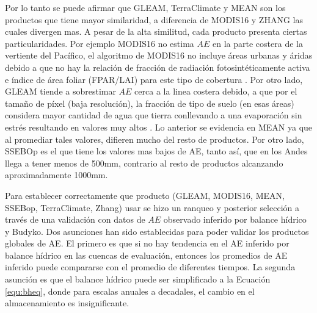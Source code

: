 \documentclass[12pt]{article}
\begin{document}
Por lo tanto se puede afirmar que GLEAM, TerraClimate y MEAN son los productos que tiene mayor similaridad, a diferencia de MODIS16 y ZHANG las cuales divergen mas. A pesar de la alta similitud, cada producto presenta ciertas particularidades. Por ejemplo MODIS16 no estima $AE$ en la parte costera de la vertiente del Pacífico, el algoritmo de MODIS16 no incluye áreas urbanas y áridas debido a que no hay la relación de fracción de radiación fotosintéticamente activa e índice de área foliar (FPAR/LAI) para este tipo de cobertura \citep{mu2013modis}. Por otro lado, GLEAM tiende a sobrestimar $AE$ cerca a la linea costera debido, a que por el tamaño de píxel (baja resolución), la fracción de tipo de suelo (en esas áreas) considera mayor cantidad de agua que tierra conllevando a una evaporación sin estrés resultando en valores muy altos \citep{Martens2017}. Lo anterior se evidencia en MEAN ya que al promediar tales valores, difieren mucho del resto de productos. Por otro lado, SSEBOp es el que tiene los valores mas bajos de AE, tanto así, que en los Andes llega a tener menos de 500mm, contrario al resto de productos alcanzando aproximadamente 1000mm.



Para establecer correctamente que producto (GLEAM, MODIS16, MEAN, SSEBop, TerraClimate, Zhang) usar se hizo un ranqueo y posterior selección a través de una validación con datos de $AE$ observado inferido por balance hídrico y Budyko. Dos asunciones han sido establecidas para poder validar los productos globales de AE. El primero es que si no hay tendencia en el AE inferido por balance hídrico en las cuencas de evaluación, entonces los promedios de AE inferido puede compararse con el promedio de diferentes tiempos. La segunda asunción es que el balance hídrico puede ser simplificado a la Ecuación \ref{equ:bheq}, donde para escalas anuales a decadales, el cambio en el almacenamiento es insignificante.
\end{document}
